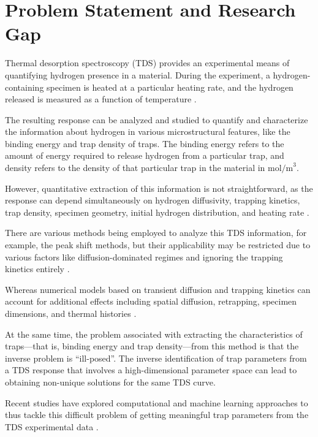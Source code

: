\documentclass[a4paper,12pt,oneside]{report}
\begin{document}

\section{Problem Statement and Research Gap}

Thermal desorption spectroscopy (TDS) provides an experimental means of quantifying hydrogen presence in a material. During the experiment, a hydrogen-containing specimen is heated at a particular heating rate, and the hydrogen released is measured as a function of temperature \cite{Legrand2015,Turnbull1997}.

The resulting response can be analyzed and studied to quantify and characterize the information about hydrogen in various microstructural features, like the binding energy and trap density of traps. The binding energy refers to the amount of energy required to release hydrogen from a particular trap, and density refers to the density of that particular trap in the material in $\text{mol/m}^3$.

However, quantitative extraction of this information is not straightforward, as the response can depend simultaneously on hydrogen diffusivity, trapping kinetics, trap density, specimen geometry, initial hydrogen distribution, and heating rate \cite{Legrand2015,Turnbull1997,Diaz2020}.

There are various methods being employed to analyze this TDS information, for example, the peak shift methods, but their applicability may be restricted due to various factors like diffusion-dominated regimes and ignoring the trapping kinetics entirely \cite{Lee1986,Wei2012}.

Whereas numerical models based on transient diffusion and trapping kinetics can account for additional effects including spatial diffusion, retrapping, specimen dimensions, and thermal histories \cite{Legrand2015,Turnbull1997,Drexler2019}.

At the same time, the problem associated with extracting the characteristics of traps---that is, binding energy and trap density---from this method is that the inverse problem is ``ill-posed''. The inverse identification of trap parameters from a TDS response that involves a high-dimensional parameter space can lead to obtaining non-unique solutions for the same TDS curve.

Recent studies have explored computational and machine learning approaches to thus tackle this difficult problem of getting meaningful trap parameters from the TDS experimental data \cite{Marrani2025,Yang2025}.
\end{document}

